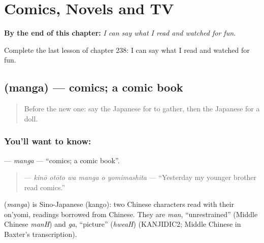 
\chapter{Comics, Novels and TV}
\label{ch:ja-comics-novels-and-tv}

\begin{chapteropening}
\textbf{By the end of this chapter:} \emph{I can say what I read and watched for fun.}

Complete the last lesson of chapter 238: I can say what I read and watched for fun.
\end{chapteropening}

\section[\texorpdfstring{\ja{まんが} (manga)}{まんが (manga)}]{ (manga) — comics; a comic book}

\label{lesson:JA-C238-manga}



\begin{quote}
Before the new one: say the Japanese for to gather, then the Japanese for a doll.
\end{quote}

\subsection*{You'll want to know: }
\textbf{} — \emph{manga} — \textquotedblleft{}comics; a comic book\textquotedblright{}.

\begin{quote}
\textbf{   } — \emph{kinō otōto wa manga o yomimashita} — \textquotedblleft{}Yesterday my younger brother read comics.\textquotedblright{}
\end{quote}

\begin{cousinweb}
\textbf{} (\emph{manga}) is Sino-Japanese (kango): two Chinese characters read with their on'yomi, readings borrowed from Chinese. They are \emph{man}, \textquotedblleft{}unrestrained\textquotedblright{} (Middle Chinese \emph{manH}) and \emph{ga}, \textquotedblleft{}picture\textquotedblright{} (\emph{hweaH}) (KANJIDIC2; Middle Chinese in Baxter's transcription).
\end{cousinweb}

